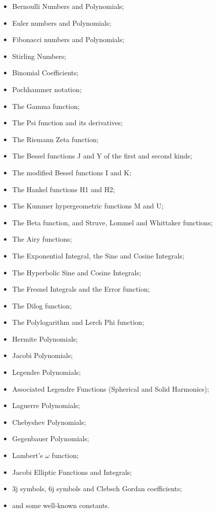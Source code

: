 \begin{itemize}
\item Bernoulli Numbers and Polynomials;
\item Euler numbers and Polynomials;
\item Fibonacci numbers and Polynomials;
\item Stirling Numbers;
\item Binomial Coefficients;
\item Pochhammer notation;
\item The Gamma function;
\item The Psi function and its derivatives;
\item The Riemann Zeta function;
\item The Bessel functions J and Y of the first and second kinds;
\item The modified Bessel functions I and K;
\item The Hankel functions H1 and H2;
\item The Kummer hypergeometric functions M and U;
\item The Beta function, and Struve, Lommel and Whittaker functions;
\item The Airy functions;
\item The Exponential Integral, the Sine and Cosine Integrals;
\item The Hyperbolic Sine and Cosine Integrals;
\item The Fresnel Integrals and the Error function;
\item The Dilog function;
\item The Polylogarithm and Lerch Phi function;
\item Hermite Polynomials;
\item Jacobi Polynomials;
\item Legendre Polynomials;
\item Associated Legendre Functions (Spherical and Solid Harmonics);
\item Laguerre Polynomials;
\item Chebyshev Polynomials;
\item Gegenbauer Polynomials;
\item Lambert's $\omega$ function;
\item Jacobi Elliptic Functions and Integrals;
\item 3j symbols, 6j symbols and Clebsch Gordan coefficients;
\item and some well-known constants.
\end{itemize}



